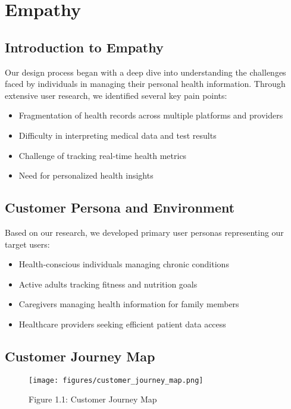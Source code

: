\pagestyle{fancy}
\thispagestyle{fancy}
\chapter{Empathy}
\section{Introduction to Empathy}
Our design process began with a deep dive into understanding the challenges faced by individuals in managing their personal health information. Through extensive user research, we identified several key pain points:

\begin{itemize}
    \item Fragmentation of health records across multiple platforms and providers
    \item Difficulty in interpreting medical data and test results
    \item Challenge of tracking real-time health metrics
    \item Need for personalized health insights
\end{itemize}

\section{Customer Persona and Environment}
Based on our research, we developed primary user personas representing our target users:

\begin{itemize}
    \item Health-conscious individuals managing chronic conditions
    \item Active adults tracking fitness and nutrition goals
    \item Caregivers managing health information for family members
    \item Healthcare providers seeking efficient patient data access
\end{itemize}

\section{Customer Journey Map}
\begin{figure}[H]
    \centering
    \texttt{[image: figures/customer\_journey\_map.png]}
    \caption{Figure 1.1: Customer Journey Map}
\end{figure}

